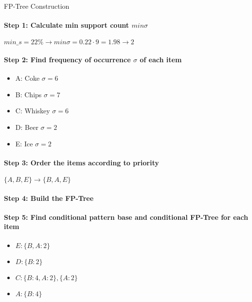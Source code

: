 \begin{KR}{FP-Tree Construction}\\
\paragraph{Step 1: Calculate min support count $min\sigma$}
$min\_s = 22\% \rightarrow min\sigma = 0.22 \cdot 9 = 1.98 \rightarrow 2$

\paragraph{Step 2: Find frequency of occurrence $\sigma$ of each item}
\begin{itemize}
    \item A: Coke $\sigma = 6$
    \item B: Chips $\sigma = 7$
    \item C: Whiskey $\sigma = 6$
    \item D: Beer $\sigma = 2$
    \item E: Ice $\sigma = 2$
\end{itemize}

\paragraph{Step 3: Order the items according to priority}
$\{A, B, E\} \rightarrow \{B, A, E\}$

\paragraph{Step 4: Build the FP-Tree}

\paragraph{Step 5: Find conditional pattern base and conditional FP-Tree for each item}
\begin{itemize}
    \item $E: \{B, A: 2\}$
    \item $D: \{B: 2\}$
    \item $C: \{B: 4, A: 2\}, \{A: 2\}$
    \item $A: \{B: 4\}$
\end{itemize}
\end{KR}


